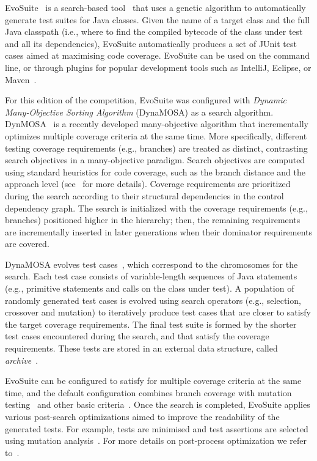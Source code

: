 \documentclass[sigconf,table]{acmart}
\newcommand{\EVOSUITE}{{\sc EvoSuite}\xspace}
\begin{document}
\EVOSUITE~\cite{FrA11c} is a search-based tool~\cite{GoA_TSE12} that
uses a genetic algorithm to automatically generate test suites for
Java classes. Given the name of a target class and the full Java
classpath (i.e., where to find the compiled bytecode of the class
under test and all its dependencies), \EVOSUITE automatically produces
a set of JUnit test cases aimed at maximising code coverage. \EVOSUITE
can be used on the command line, or through plugins for popular
development tools such as IntelliJ, Eclipse, or
Maven~\cite{ICST16_Tool}.

For this edition of the competition, \EVOSUITE was configured with \textit{Dynamic Many-Objective Sorting Algorithm} (DynaMOSA) as a search algorithm. DynMOSA~\cite{dynamosa, panichella:ssbse2018} is a recently developed many-objective algorithm that incrementally optimizes multiple coverage criteria at the same time. More specifically, different testing coverage requirements (e.g., branches) are treated as distinct, contrasting search objectives in a many-objective paradigm. Search objectives are computed using standard heuristics for code coverage, such as the branch distance and the approach level (see~\cite{GoA_TSE12} for more details). Coverage requirements are prioritized during the search according to their structural dependencies in the control dependency graph. The search is initialized with the coverage requirements (e.g., branches) positioned higher in the hierarchy; then, the remaining requirements are incrementally inserted in later generations when their dominator requirements are covered.

DynaMOSA evolves test cases~\cite{dynamosa}, which correspond to the chromosomes for the search. Each test case consists of variable-length sequences of Java statements (e.g., primitive statements and calls on the class under test). A population of randomly generated test cases is evolved using search operators (e.g., selection, crossover and mutation) to iteratively produce test cases that are closer to satisfy the target coverage requirements. The final test suite is formed by the shorter test cases encountered during the search, and that satisfy the coverage requirements. These tests are stored in an external data structure, called \textit{archive}~\cite{mosa,dynamosa}.

\EVOSUITE can be configured to satisfy for multiple coverage criteria at the same time, and the default configuration combines branch coverage with
mutation testing~\cite{emse14_mutation} and other basic
criteria~\cite{rojas2015combining}. Once the search is completed, \EVOSUITE applies various post-search optimizations aimed to improve the readability of
the generated tests. For example, tests are minimised and test assertions are selected using mutation analysis~\cite{10.1109/TSE.2011.93}. For more details on post-process optimization we refer to~\cite{FrA11c,FrA13a}.
\end{document}
